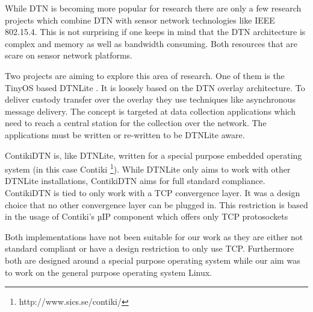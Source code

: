 While DTN is becoming more popular for research there are only a few research
projects which combine DTN with sensor network technologies like IEEE 802.15.4.
This is not surprising if one keeps in mind that the DTN architecture is
complex and memory as well as bandwidth consuming. Both resources that are scare
on sensor network platforms.

Two projects are aiming to explore this area of research. One of them is the
TinyOS based DTNLite \cite{dtnlite}. It is loosely based on the DTN overlay
architecture. To deliver custody transfer over the overlay they use techniques
like asynchronous message delivery. The concept is targeted at data collection
applications which need to reach a central station for the collection over the
network. The applications must be written or re-written to be DTNLite aware.

ContikiDTN \cite{contikidtn} is, like DTNLite, written for a special purpose
embedded operating system (in this case Contiki
\footnote{http://www.sics.se/contiki/}). While DTNLite only aims to work with
other DTNLite installations, ContikiDTN aims for full standard compliance.
ContikiDTN is tied to only work with a TCP convergence layer. It was a design
choice that no other convergence layer can be plugged in. This restriction is based in
the usage of Contiki's µIP component which offers only TCP protosockets

Both implementations have not been suitable for our work as they are either not
standard compliant or have a design restriction to only use TCP. Furthermore both
are designed around a special purpose operating system while our aim was to work
on the general purpose operating system Linux.
